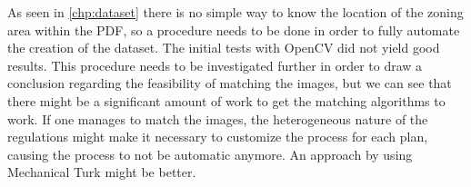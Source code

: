 As seen in \autoref{chp:dataset} there is no simple way to know the location of the zoning area within the PDF, so a procedure needs to be done in order to fully automate the creation of the dataset. The initial tests with OpenCV did not yield good results. This procedure needs to be investigated further in order to draw a conclusion regarding the feasibility of matching the images, but we can see that there might be a significant amount of work to get the matching algorithms to work. If one manages to match the images, the heterogeneous nature of the regulations might make it necessary to customize the process for each plan, causing the process to not be automatic anymore. An approach by using Mechanical Turk might be better.
